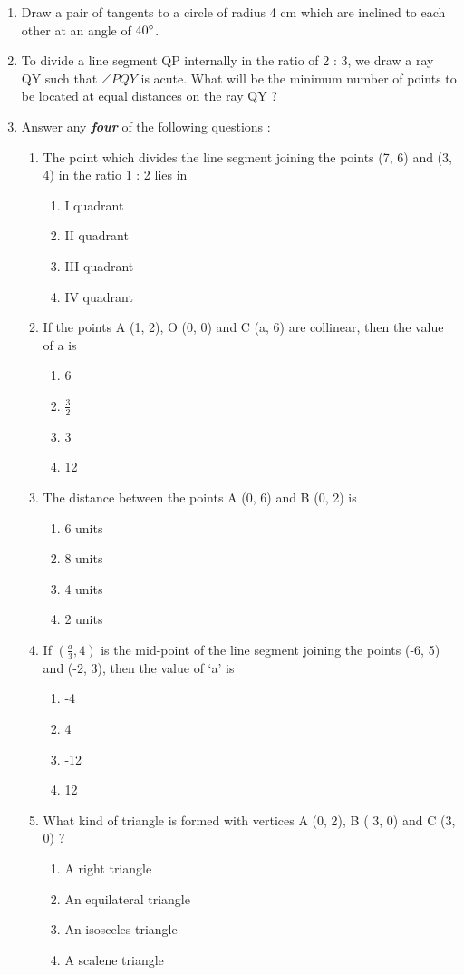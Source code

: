 \documentclass{article}
\begin{document}
\begin{enumerate}
		\item Draw a pair of tangents to a circle of radius 4 cm which are inclined to each other at an angle of $40\degree$. 
		
		\item To divide a line segment QP internally in the ratio of 2 : 3, we draw a ray QY such that $\angle PQY$ is acute. What will be the minimum number of points to be located at equal distances on the ray QY ? 
		
		\item Answer any \textbf{\textit{four}} of the following questions : 
		
		\begin{enumerate}
			\item The point which divides the line segment joining the points (7, 6) and (3, 4) in the ratio 1 : 2 lies in
			\begin{enumerate}
				\item I quadrant 
				\item II quadrant 
				\item III quadrant  
				\item IV quadrant
			\end{enumerate}
			\item  If the points A (1, 2), O (0, 0) and C (a, 6) are collinear, then the value of a is 
			\begin{enumerate}
				\item 6
				\item $\frac{3}{2}$
				\item 3
				\item 12
			\end{enumerate}
			\item  The distance between the points A (0, 6) and B (0, 2) is 
			\begin{enumerate}
				\item 6 units
				\item 8 units
				\item 4 units
				\item 2 units
			\end{enumerate}
			\item  If $(\frac{a}{3},4)$ is the mid-point of the line segment joining the points (-6, 5) and (-2, 3), then the value of {\lq a\rq} is
			\begin{enumerate}
				\item -4
				\item 4
				\item -12
				\item 12
			\end{enumerate}
			\item  What kind of triangle is formed with vertices A (0, 2), B ( 3, 0) and C (3, 0) ? 
			\begin{enumerate}
				\item A right triangle 
				\item An equilateral triangle
				\item An isosceles triangle 
				\item A scalene triangle 
			\end{enumerate}
		\end{enumerate}
		

\end{enumerate}
\end{document}
